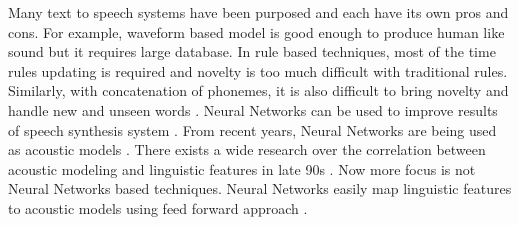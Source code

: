 Many text to speech systems have been purposed and each have its own pros and cons. For example, waveform based model is good enough to produce human like sound but it requires large database. In rule based techniques, most of the time rules updating is required and novelty is too much difficult with traditional rules. Similarly, with concatenation of phonemes, it is also difficult to bring novelty and handle new and unseen words \cite{karaali1998text, pitrelli2004tobi}. Neural Networks can be used to improve results of speech synthesis system \cite{muthukumar2016recurrent}. From recent years, Neural Networks are being used as acoustic models \cite{ling2015deep, zen2015acoustic}. There exists a wide research over the correlation between acoustic modeling and linguistic features in late 90s \cite{cawley1993lsp}. Now more focus is not Neural Networks based techniques. Neural Networks easily map linguistic features to acoustic models using feed forward approach \cite{lu2013combining, qian2014training, chen2015deep, ze2013statistical}. 